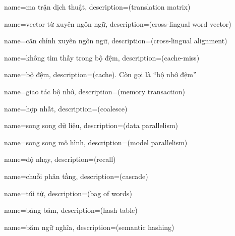 {
    name={ma trận dịch thuật},
    description={(translation matrix)}
}

{
    name={vector từ xuyên ngôn ngữ},
    description={(cross-lingual word vector)}
}

{
    name={căn chỉnh xuyên ngôn ngữ},
    description={(cross-lingual alignment)}
}

{
    name={không tìm thấy trong bộ đệm},
    description={(cache-miss)}
}

{
    name={bộ đệm},
    description={(cache). Còn gọi là ``bộ nhớ đệm''}
}

{
    name={giao tác bộ nhớ},
    description={(memory transaction)}
}

{
    name={hợp nhất},
    description={(coalesce)}
}

{
    name={song song dữ liệu},
    description={(data parallelism)}
}

{
    name={song song mô hình},
    description={(model parallelism)}
}

{
    name={độ nhạy},
    description={(recall)}
}

{
    name={chuỗi phân tầng},
    description={(cascade)}
}

{
    name={túi từ},
    description={(bag of words)}
}

{
    name={bảng băm},
    description={(hash table)}
}

{
    name={băm ngữ nghĩa},
    description={(semantic hashing)}
}








